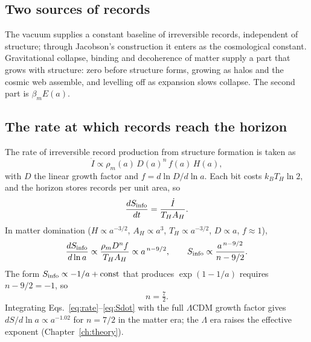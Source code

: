 \subsection{Two sources of records}
The vacuum supplies a constant baseline of irreversible records, independent of structure; through Jacobson's construction it enters as the cosmological
constant. Gravitational collapse, binding and decoherence of matter supply a part that grows with structure: zero before structure forms, growing as halos
and the cosmic web assemble, and levelling off as expansion slows collapse. The second part is $\beta_mE(a)$.

\subsection{The rate at which records reach the horizon}
The rate of irreversible record production from structure formation is taken as
\begin{equation}
\dot I\propto\rho_m(a)\,D(a)^n\,f(a)\,H(a), \label{eq:rate}
\end{equation}
with $D$ the linear growth factor and $f=d\ln D/d\ln a$. Each bit costs $k_BT_H\ln2$, and the horizon stores records per unit area, so
\begin{equation}
\frac{dS_{\rm info}}{dt}=\frac{\dot I}{T_HA_H}. \label{eq:Sdot}
\end{equation}
In matter domination ($H\propto a^{-3/2}$, $A_H\propto a^3$, $T_H\propto a^{-3/2}$, $D\propto a$, $f\approx1$),
\begin{equation}
\frac{dS_{\rm info}}{d\ln a}\propto\frac{\rho_mD^nf}{T_HA_H}\propto a^{\,n-9/2},\qquad S_{\rm info}\propto\frac{a^{\,n-9/2}}{n-9/2}.
\end{equation}
The form $S_{\rm info}\propto-1/a+{\rm const}$ that produces $\exp(1-1/a)$ requires $n-9/2=-1$, so
\begin{equation}
n=\tfrac72 .
\end{equation}
Integrating Eqs.~\eqref{eq:rate}--\eqref{eq:Sdot} with the full $\Lambda$CDM growth factor gives $dS/d\ln a\propto a^{-1.02}$ for $n=7/2$ in the matter era;
the $\Lambda$ era raises the effective exponent (Chapter~\ref{ch:theory}).

